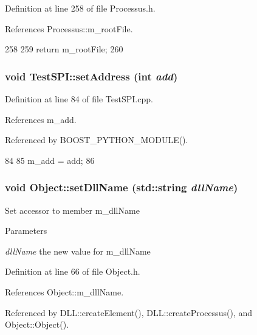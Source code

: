 Definition at line 258 of file Processus.h.

References Processus::m\_\-rootFile.


\begin{DoxyCode}
258                      {
259     return m_rootFile;
260   }
\end{DoxyCode}
\hypertarget{classTestSPI_aaf3401bdea3168f816a4df5a00694c0b}{
\subsubsection[{setAddress}]{\setlength{\rightskip}{0pt plus 5cm}void TestSPI::setAddress (int {\em add})}}
\label{classTestSPI_aaf3401bdea3168f816a4df5a00694c0b}


Definition at line 84 of file TestSPI.cpp.

References m\_\-add.

Referenced by BOOST\_\-PYTHON\_\-MODULE().


\begin{DoxyCode}
84                                {
85   m_add = add;
86 }
\end{DoxyCode}
\hypertarget{classObject_a870c5af919958c2136623b2d7816d123}{
\subsubsection[{setDllName}]{\setlength{\rightskip}{0pt plus 5cm}void Object::setDllName (std::string {\em dllName})}}
\label{classObject_a870c5af919958c2136623b2d7816d123}
Set accessor to member m\_\-dllName 
\begin{DoxyParams}{Parameters}
\item[{\em dllName}]the new value for m\_\-dllName \end{DoxyParams}


Definition at line 66 of file Object.h.

References Object::m\_\-dllName.

Referenced by DLL::createElement(), DLL::createProcessus(), and Object::Object().



